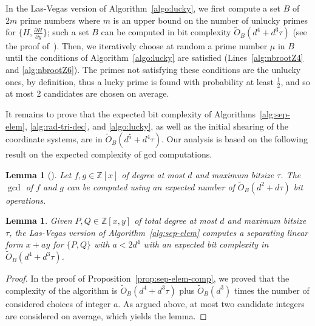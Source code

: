 \documentclass{sig-alternate}
\newtheorem{lemma}[theorem]{Lemma}
\newcommand {\Z}   {\mathbb Z}
\newcommand{\sOB}{\ensuremath{\widetilde{{O}}_B}}
\newcommand{\blue}[1]{\color{blue}#1\color{black}\xspace}
\renewcommand{\blue}[1]{#1\xspace}
\begin{document}
\blue{In the Las-Vegas version of} Algorithm~\ref{algo:lucky}, we  first compute a set $B$ of $2m$ prime numbers where $m$ is an
upper bound on the number of unlucky primes for $\{H,\frac{\partial H}{\partial y}\}$; such 
a set $B$ can be computed in bit complexity $\sOB(d^4+d^3\tau)$ (see the proof of~\blue{\cite[Lemma 18]{bouzidiJSC2014a}}).  Then, we iteratively choose at random a prime number $\mu$ in $B$ until the conditions of
Algorithm~\ref{algo:lucky} are satisfied (Lines~\ref{alg:nbrootZ4} and \ref{alg:nbrootZ6}). 
The primes not satisfying these conditions are the unlucky ones, by definition, thus a lucky prime
is found with probability at least $\frac12$, and so at most 2 candidates are
chosen on average. 


It remains to prove that the expected bit complexity of Algorithms~\ref{alg:sep-elem},
\ref{alg:rad-tri-dec}, and \ref{algo:lucky}, as well as the initial \blue{shearing} of
the coordinate systems, are in $\sOB(d^5+d^4\tau)$.
Our analysis is based on the following result on the expected complexity  of gcd computations.


\begin{lemma}[{\cite[Cor. 11.11]{vzGGer2}}]\label{lem:expected-gcd}
Let $f,g \in \Z[x]$ of degree at most $d$ and maximum bitsize $\tau$. The $\gcd$ of $f$ and $g$ can be computed using an expected number of $\sOB(d^2+d\tau)$ bit operations.
\end{lemma}


\begin{lemma}\label{lem:sep-elem-comp-exp}
Given  $P,Q \in \Z[x,y]$ of total degree at most $d$ and maximum bitsize $\tau$,
the Las-Vegas version of Algorithm~\ref{alg:sep-elem}  computes a separating linear form $x+ay$ for $\{P,Q\}$ with
$a<2d^4$ with an expected bit complexity in  $\sOB(d^4+d^3{\tau})$. 
\end{lemma}
\begin{proof}
  In the proof of Proposition~\ref{prop:sep-elem-comp}, we proved that the complexity of the algorithm
  is $\sOB(d^4+d^3\tau)$ plus $\sOB(d^3)$ times the number of considered choices of integer $a$. As
  argued above, at most two candidate integers are considered on average, which yields the lemma.
\end{proof}
\end{document}
